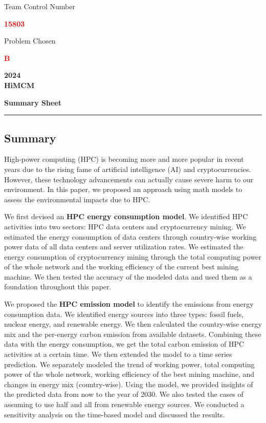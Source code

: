 \documentclass[12pt]{article}
\newcommand{\identifierRedFont}[1]{{\huge \textbf{\textcolor{red}{#1}}}}
\begin{document}
\thispagestyle{empty}

\begin{center}
	Team Control Number
	
	\identifierRedFont{15803}

	Problem Chosen
	
	\identifierRedFont{B}

	\textbf{\large 2024} \\
	\textbf{HiMCM}

	\textbf{\small Summary Sheet}
\end{center}

\noindent\rule{\textwidth}{1pt}

\begin{center}
	\section*{Summary}
\end{center}

High-power computing (HPC) is becoming more and more popular in recent years due to the rising fame of artificial intelligence (AI) and cryptocurrencies. However, these technology advancements can actually cause severe harm to our environment. In this paper, we proposed an approach using math models to assess the environmental impacts due to HPC.

We first devised an \textbf{HPC energy consumption model}. We identified HPC activities into two sectors: HPC data centers and cryptocurrency mining. We estimated the energy consumption of data centers through country-wise working power data of all data centers and server utilization rates. We estimated the energy consumption of cryptocurrency mining through the total computing power of the whole network and the working efficiency of the current best mining machine. We then tested the accuracy of the modeled data and used them as a foundation throughout this paper.

We proposed the \textbf{HPC  emission model} to identify the  emissions from energy consumption data. We identified energy sources into three types: fossil fuels, nuclear energy, and renewable energy. We then calculated the country-wise energy mix and the per-energy carbon emission from available datasets. Combining these data with the energy consumption, we get the total carbon emission of HPC activities at a certain time. We then extended the model to a time series prediction. We separately modeled the trend of working power, total computing power of the whole network, working efficiency of the best mining machine, and changes in energy mix (country-wise). Using the model, we provided insights of the predicted data from now to the year of 2030. We also tested the cases of assuming to use half and all from renewable energy sources. We conducted a sensitivity analysis on the time-based model and discussed the results.
\end{document}
